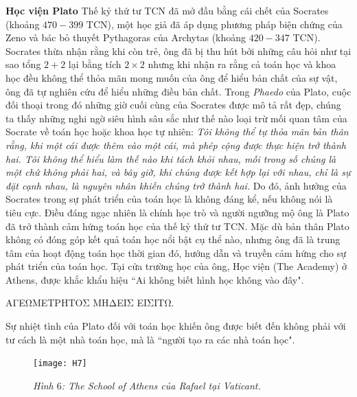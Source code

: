\begin{multicols}{2}
	\textbf{\color{lichsutoanhoc}Học viện Plato}
		\vskip 0.1cm
		Thế kỷ thứ tư TCN đã mở đầu bằng cái chết của Socrates (khoảng $470-399$ TCN), một học giả đã áp dụng phương pháp biện chứng của Zeno và bác bỏ thuyết Pythagoras của Archytas (khoảng $420-347$ TCN). Socrates thừa nhận rằng khi còn trẻ, ông đã bị thu hút bởi những câu hỏi như tại sao tổng $2 + 2$ lại bằng tích $2 \times 2$  nhưng khi nhận ra rằng cả toán học và khoa học đều không thể thỏa mãn mong muốn của ông để  hiểu bản chất của sự vật, ông đã tự nghiên cứu để hiểu những điều bản chất.
		\vskip 0.1cm
		Trong \textit{Phaedo} của Plato, cuộc đối thoại trong đó những giờ cuối cùng của Socrates được mô tả rất đẹp, chúng ta thấy những nghi ngờ siêu hình sâu sắc như thế nào loại trừ mối quan tâm của Socrate về toán học hoặc khoa học tự nhiên:
		\vskip 0.1cm
		\textit{Tôi không thể tự thỏa mãn bản thân rằng, khi một cái được thêm vào một cái, mà phép cộng được thực hiện trở thành hai. 
		\vskip 0.1cm
		Tôi không thể hiểu làm thế nào khi tách khỏi nhau, mỗi trong số chúng là một chứ không phải hai, và bây giờ, khi chúng được kết hợp lại với nhau, chỉ là sự đặt cạnh nhau, là nguyên nhân khiến chúng trở thành hai.}
		\vskip 0.1cm
		Do đó, ảnh hưởng của Socrates trong sự phát triển của toán học là không đáng kể, nếu không nói là tiêu cực. Điều đáng ngạc nhiên là chính học trò và người ngưỡng mộ ông là Plato đã trở thành cảm hứng toán học của thế kỷ thứ tư TCN. 
		\vskip 0.1cm
		Mặc dù bản thân Plato không có đóng góp kết quả toán học nổi bật cụ thể nào, nhưng ông đã là trung tâm của hoạt động toán học thời gian đó, hướng dẫn và truyền cảm hứng cho sự phát triển của toán học. Tại cửa trường học của ông, Học viện (The Academy) ở Athens, được khắc khẩu hiệu ``Ai không biết hình học không vào đây".
		\begin{tBox}
			ΑΓΕΩΜΕΤΡΗΤΟΣ ΜΗΔΕΙΣ ΕΙΣΙΤΩ.
		\end{tBox}
		Sự nhiệt tình của Plato đối với toán học khiến ông được biết đến không phải với tư cách là một nhà toán học, mà là ``người tạo ra các nhà toán học".
			\end{multicols}
	\begin{figure}[H]
	\vspace*{5pt}
	\centering
	\captionsetup{labelformat= empty, justification=centering}
	\texttt{[image: H7]}
	\caption{\small\textit{\color{lichsutoanhoc}Hình $6$: The School of Athens của Rafael tại Vaticant.}}
	\vspace*{-10pt}
\end{figure}
